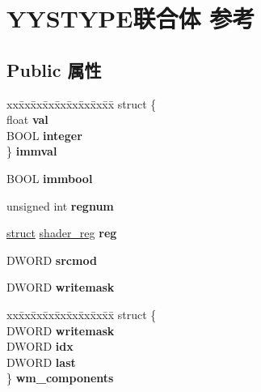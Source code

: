 \hypertarget{union_y_y_s_t_y_p_e}{}\section{Y\+Y\+S\+T\+Y\+P\+E联合体 参考}
\label{union_y_y_s_t_y_p_e}
\subsection*{Public 属性}
\begin{DoxyCompactItemize}
\item 
\mbox{\label{union_y_y_s_t_y_p_e_a5c26e8465337cabd2d337bdf5ca92dd0}} 
\begin{tabbing}
xx\=xx\=xx\=xx\=xx\=xx\=xx\=xx\=xx\=\kill
struct \{\\
\>float {\bfseries val}\\
\>BOOL {\bfseries integer}\\
\} {\bfseries immval}\\

\end{tabbing}\item 
\mbox{\label{union_y_y_s_t_y_p_e_a40adceac189b769a67e061fc32b85dbc}} 
B\+O\+OL {\bfseries immbool}
\item 
\mbox{\label{union_y_y_s_t_y_p_e_a69ea8230b686df66fa81712398f2019a}} 
unsigned int {\bfseries regnum}
\item 
\mbox{\label{union_y_y_s_t_y_p_e_af77b75a000723f4b141c60fd5641f217}} 
\hyperlink{interfacestruct}{struct} \hyperlink{structshader__reg}{shader\+\_\+reg} {\bfseries reg}
\item 
\mbox{\label{union_y_y_s_t_y_p_e_adf180075a6a7c07f8825a0301468eea5}} 
D\+W\+O\+RD {\bfseries srcmod}
\item 
\mbox{\label{union_y_y_s_t_y_p_e_a60eff0e599c41eeac54ed886ce6889fb}} 
D\+W\+O\+RD {\bfseries writemask}
\item 
\mbox{\label{union_y_y_s_t_y_p_e_a4a3b9fe689c62ac2f09590ca0465d43a}} 
\begin{tabbing}
xx\=xx\=xx\=xx\=xx\=xx\=xx\=xx\=xx\=\kill
struct \{\\
\>DWORD {\bfseries writemask}\\
\>DWORD {\bfseries idx}\\
\>DWORD {\bfseries last}\\
\} {\bfseries wm\_components}\\


\end{tabbing}
\end{DoxyCompactItemize}
